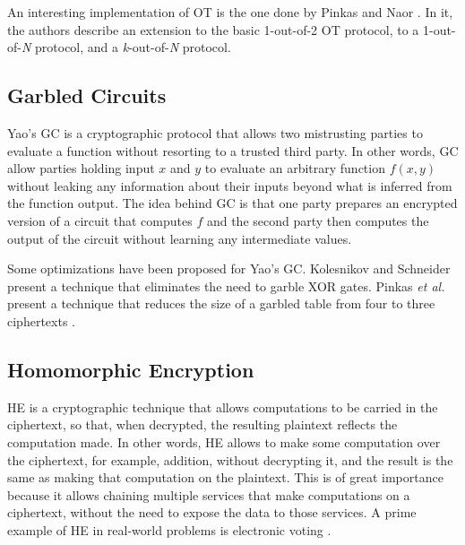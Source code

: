 An interesting implementation of \ac{OT} is the one done by Pinkas and Naor \cite{naor2005computationally}. In it, the authors describe an extension to the basic 1-out-of-2 \ac{OT} protocol, to a 1-out-of-\textit{N} protocol, and a \textit{k}-out-of-\textit{N} protocol.


\subsection{Garbled Circuits} 
\label{ssec:GarbledCircuits}


Yao's \acf{GC} \cite{yao1986generate} is a cryptographic protocol that allows two mistrusting parties to evaluate a function without resorting to a trusted third party. In other words, \ac{GC} allow parties holding input $x$ and $y$ to evaluate an arbitrary function $f(x,y)$ without leaking any information about their inputs beyond what is inferred from the function output. The idea behind \ac{GC} is that one party prepares an encrypted version of a circuit that computes $f$ and the second party then computes the output of the circuit without learning any intermediate values.

Some optimizations have been proposed for Yao's \ac{GC}. Kolesnikov and Schneider \cite{kolesnikov2008improved} present a technique that eliminates the need to garble XOR gates. Pinkas \textit{et al.} present a technique that reduces the size of a garbled table from four to three ciphertexts \cite{pinkas2009secure}.


\subsection{Homomorphic Encryption}
\label{ssec:HomomorphicEncryption}


\acf{HE} \cite{rivest1978data} is a cryptographic technique that allows computations to be carried in the ciphertext, so that, when decrypted, the resulting plaintext reflects the computation made. In other words, \ac{HE} allows to make some computation over the ciphertext, for example, addition, without decrypting it, and the result is the same as making that computation on the plaintext. This is of great importance because it allows chaining multiple services that make computations on a ciphertext, without the need to expose the data to those services. A prime example of \ac{HE} in real-world problems is electronic voting \cite{hirt2000efficient}.

